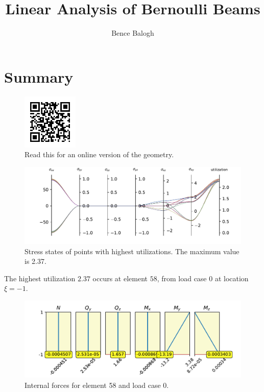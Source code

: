 \documentclass{article}%
\title{Linear Analysis of Bernoulli Beams}%
\author{Bence Balogh}%
\date{}%
\begin{document}
%
\normalsize%
\maketitle%
\hrulefill%
\tableofcontents%
\renewcommand{\arraystretch}{1.2}%
\setlength{\tabcolsep}{6pt}%
\section{Summary}%
\label{sec:Summary}%


\begin{figure}[h!]%
\centering%
\includegraphics[width=100px]{qrcode.png}%
\caption{Read this for an online version of the geometry.}%
\end{figure}

%


\begin{figure}[h!]%
\centering%
\includegraphics[width=\textwidth]{bernoulli_B2_parallel_1.pdf}%
\caption{Stress states of points with highest utilizations. The maximum value is 2.37.}%
\end{figure}

%
\newpage%
The highest utilization $2.37$ occurs at element $58$, from load case $0$ at location $\xi=-1$.%


\begin{figure}[h!]%
\centering%
\includegraphics[width=\textwidth]{bernoulli_B2_parallel_2.pdf}%
\caption{Internal forces for element 58 and load case 0.}%
\end{figure}
\end{document}

